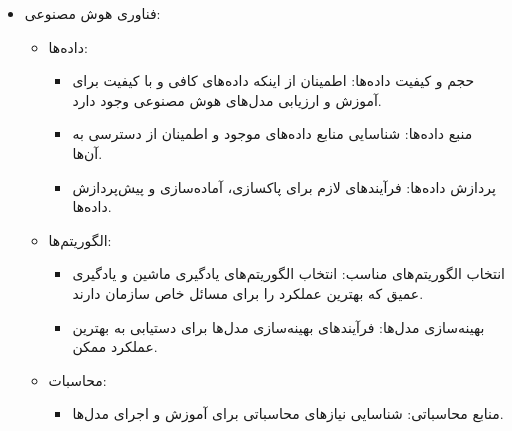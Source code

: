 \documentclass[a4paper,10pt]{article}
\begin{document}
                \begin{itemize}
                    
                    \item فناوری هوش مصنوعی:

                    \begin{itemize}
                        
                        \item داده‌ها:
                        
                        \begin{itemize}
                            
                            \item حجم و کیفیت داده‌ها: اطمینان از اینکه داده‌های کافی و با کیفیت برای آموزش و ارزیابی مدل‌های هوش مصنوعی وجود دارد.

                            \item منبع داده‌ها: شناسایی منابع داده‌های موجود و اطمینان از دسترسی به آن‌ها.

                            \item پردازش داده‌ها: فرآیندهای لازم برای پاکسازی، آماده‌سازی و پیش‌پردازش داده‌ها.

                        \end{itemize}

                        \item الگوریتم‌ها:

                        \begin{itemize}
                            
                            \item انتخاب الگوریتم‌های مناسب: انتخاب الگوریتم‌های یادگیری ماشین و یادگیری عمیق که بهترین عملکرد را برای مسائل خاص سازمان دارند.

                            \item بهینه‌سازی مدل‌ها: فرآیندهای بهینه‌سازی مدل‌ها برای دستیابی به بهترین عملکرد ممکن.

                        \end{itemize}

                        \item محاسبات:

                        \begin{itemize}
                            
                            \item منابع محاسباتی: شناسایی نیازهای محاسباتی برای آموزش و اجرای مدل‌ها.


\end{itemize}
\end{itemize}
\end{itemize}
\end{document}

